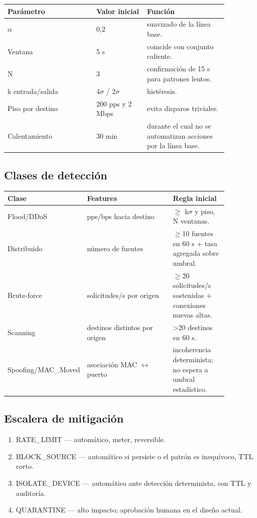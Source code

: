 \documentclass[11pt,a4paper]{article}
\begin{document}
\begin{longtable}{p{0.35\linewidth}p{0.2\linewidth}p{0.32\linewidth}}
\toprule
Parámetro & Valor inicial & Función\\
\midrule
$\alpha$ & 0,2 & suavizado de la línea base.\\
Ventana & 5 s & coincide con conjunto caliente.\\
N & 3 & confirmación de 15 s para patrones lentos.\\
k entrada/salida & 4$\sigma$ / 2$\sigma$ & histéresis.\\
Piso por destino & 200 pps y 2 Mbps & evita disparos triviales.\\
Calentamiento & 30 min & durante el cual no se automatizan acciones por la línea base.\\
\bottomrule
\end{longtable}

\subsection{Clases de detección}

\begin{longtable}{p{0.23\linewidth}p{0.39\linewidth}p{0.25\linewidth}}
\toprule
Clase & Features & Regla inicial\\
\midrule
Flood/DDoS & pps/bps hacia destino & $\geq$ k$\sigma$ y piso, N ventanas.\\
Distribuido & número de fuentes & $\geq$10 fuentes en 60 s + tasa agregada sobre umbral.\\
Brute-force & solicitudes/s por origen & $\geq$20 solicitudes/s sostenidas + conexiones nuevas altas.\\
Scanning & destinos distintos por origen & >20 destinos en 60 s.\\
Spoofing/MAC\_Moved & asociación MAC \(\leftrightarrow\) puerto & incoherencia determinista; no espera a umbral estadístico.\\
\bottomrule
\end{longtable}

\subsection{Escalera de mitigación}

\begin{enumerate}
\item RATE\_LIMIT --- automático, meter, reversible.
\item BLOCK\_SOURCE --- automático si persiste o el patrón es inequívoco, TTL corto.
\item ISOLATE\_DEVICE --- automático ante detección determinista, con TTL y auditoría.
\item QUARANTINE --- alto impacto; aprobación humana en el diseño actual.
\end{enumerate}
\end{document}
